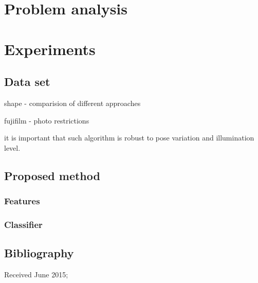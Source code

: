 \documentclass[hyperref]{acmtrans2e}
\begin{document}
\section{Problem analysis}
\section{Experiments}
\subsection{Data set}
shape - comparision of different approaches

fujifilm - photo restrictions

it is important that such algorithm is robust to pose variation and illumination level.
\subsection{Proposed method}
\subsubsection{Features}
\subsubsection{Classifier}

\subsection{Bibliography}


\begin{received}
Received June 2015;
\end{received}
\end{document}
